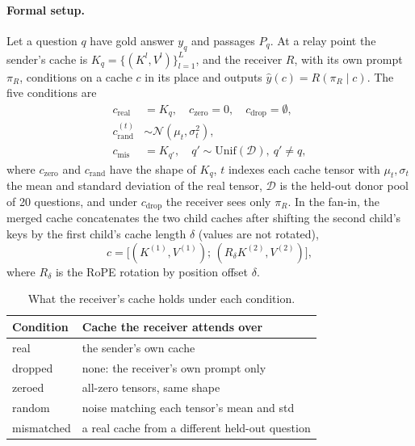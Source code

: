 \documentclass[11pt]{article}
\begin{document}
\paragraph{Formal setup.} Let a question $q$ have gold answer $y_q$ and passages $P_q$. At a relay
point the sender's cache is $K_q=\{(K^{l},V^{l})\}_{l=1}^{L}$, and the receiver $R$, with its own prompt
$\pi_R$, conditions on a cache $c$ in its place and outputs $\hat y(c)=R(\pi_R\mid c)$. The five conditions are
\begin{align*}
c_{\mathrm{real}} &= K_q,\quad c_{\mathrm{zero}} = 0,\quad c_{\mathrm{drop}} = \emptyset,\\
c_{\mathrm{rand}}^{(t)} &\sim \mathcal{N}(\mu_t,\sigma_t^{2}),\\
c_{\mathrm{mis}} &= K_{q'},\quad q'\sim\mathrm{Unif}(\mathcal{D}),\ q'\neq q,
\end{align*}
where $c_{\mathrm{zero}}$ and $c_{\mathrm{rand}}$ have the shape of $K_q$, $t$ indexes each cache tensor with
$\mu_t,\sigma_t$ the mean and standard deviation of the real tensor, $\mathcal{D}$ is the held-out donor pool
of 20 questions, and under $c_{\mathrm{drop}}$ the receiver sees only $\pi_R$. In the fan-in, the merged cache concatenates the two child caches after shifting the second
child's keys by the first child's cache length $\delta$ (values are not rotated),
\[
c=\bigl[(K^{(1)},V^{(1)});\,(R_{\delta}K^{(2)},V^{(2)})\bigr],
\]
where $R_{\delta}$ is the RoPE rotation by position offset $\delta$.

\begin{table}[t]
\centering
\small
\caption{What the receiver's cache holds under each condition.}
\label{tab:conditions}
\begin{tabular}{lp{5.2cm}}
\toprule
\textbf{Condition} & \textbf{Cache the receiver attends over} \\
\midrule
real       & the sender's own cache \\
dropped    & none: the receiver's own prompt only \\
zeroed     & all-zero tensors, same shape \\
random     & noise matching each tensor's mean and std \\
mismatched & a real cache from a different held-out question \\
\bottomrule
\end{tabular}
\end{table}
\end{document}
